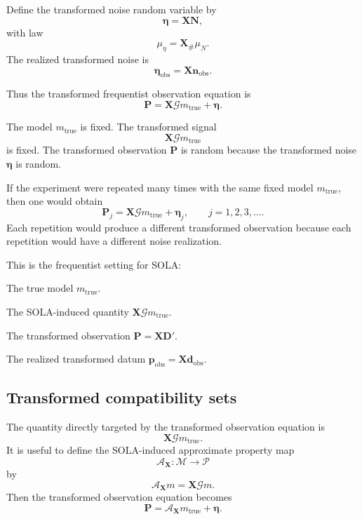 \documentclass[11pt]{article}
\newcommand{\Mspace}{\mathcal M}
\newcommand{\Pspace}{\mathcal P}
\newcommand{\muN}{\mu_N}
\newcommand{\Dobsrand}{\mathbf D'}
\newcommand{\Nrand}{\mathbf N}
\newcommand{\Prand}{\mathbf P}
\newcommand{\dobs}{\mathbf d_{\mathrm{obs}}}
\newcommand{\nobs}{\mathbf n_{\mathrm{obs}}}
\newcommand{\pobs}{\mathbf p_{\mathrm{obs}}}
\newcommand{\G}{\mathcal G}
\newcommand{\X}{\mathbf X}
\newcommand{\A}{\mathcal A}
\begin{document}
Define the transformed noise random variable by
\[
    \boldsymbol{\eta}
    =
    \X\Nrand,
\]
with law
\[
    \mu_{\eta}
    =
    \X_{\#}\muN.
\]
The realized transformed noise is
\[
    \boldsymbol{\eta}_{\mathrm{obs}}
    =
    \X\nobs.
\]

Thus the transformed frequentist observation equation is
\[
    \Prand
    =
    \X\G m_{\mathrm{true}}
    +
    \boldsymbol{\eta}.
\]

The model \(m_{\mathrm{true}}\) is fixed. The transformed signal
\[
    \X\G m_{\mathrm{true}}
\]
is fixed. The transformed observation \(\Prand\) is random because the transformed noise \(\boldsymbol{\eta}\) is random.

If the experiment were repeated many times with the same fixed model \(m_{\mathrm{true}}\), then one would obtain
\[
    \Prand_j
    =
    \X\G m_{\mathrm{true}}
    +
    \boldsymbol{\eta}_j,
    \qquad
    j=1,2,3,\dots.
\]
Each repetition would produce a different transformed observation because each repetition would have a different noise realization.

This is the frequentist setting for SOLA:
\begin{description}[leftmargin=3.5cm,style=nextline]
    \item[Fixed object.]
    The true model \(m_{\mathrm{true}}\).

    \item[Fixed transformed signal.]
    The SOLA-induced quantity \(\X\G m_{\mathrm{true}}\).

    \item[Random object.]
    The transformed observation \(\Prand=\X\Dobsrand\).

    \item[Observed object.]
    The realized transformed datum \(\pobs=\X\dobs\).
\end{description}

\subsection{Transformed compatibility sets}

The quantity directly targeted by the transformed observation equation is
\[
    \X\G m_{\mathrm{true}}.
\]
It is useful to define the SOLA-induced approximate property map
\[
    \A_{\X}:\Mspace\to\Pspace
\]
by
\[
    \A_{\X}m
    =
    \X\G m.
\]
Then the transformed observation equation becomes
\[
    \Prand
    =
    \A_{\X}m_{\mathrm{true}}
    +
    \boldsymbol{\eta}.
\]
\end{document}
